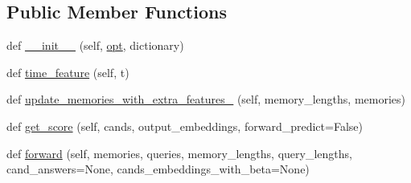 \subsection*{Public Member Functions}
\begin{DoxyCompactItemize}
\item 
def \hyperlink{classprojects_1_1memnn__feedback_1_1agent_1_1modules_1_1MemNN_a8fa66da5b82d5f224fe6d90f6beb4715}{\+\_\+\+\_\+init\+\_\+\+\_\+} (self, \hyperlink{classprojects_1_1memnn__feedback_1_1agent_1_1modules_1_1MemNN_ad5ca60da96aa65443275f7702521ed4d}{opt}, dictionary)
\item 
def \hyperlink{classprojects_1_1memnn__feedback_1_1agent_1_1modules_1_1MemNN_a74960a2ae628065a6c18e1125b8fd9fc}{time\+\_\+feature} (self, t)
\item 
def \hyperlink{classprojects_1_1memnn__feedback_1_1agent_1_1modules_1_1MemNN_a0842ffd89a6a7b05ecd96ffd9167ec25}{update\+\_\+memories\+\_\+with\+\_\+extra\+\_\+features\+\_\+} (self, memory\+\_\+lengths, memories)
\item 
def \hyperlink{classprojects_1_1memnn__feedback_1_1agent_1_1modules_1_1MemNN_abdfd4ea1cd5d9eada46e5f091d026d59}{get\+\_\+score} (self, cands, output\+\_\+embeddings, forward\+\_\+predict=False)
\item 
def \hyperlink{classprojects_1_1memnn__feedback_1_1agent_1_1modules_1_1MemNN_a2e5d4d84ef6b83ba8e6d8e765727973d}{forward} (self, memories, queries, memory\+\_\+lengths, query\+\_\+lengths, cand\+\_\+answers=None, cands\+\_\+embeddings\+\_\+with\+\_\+beta=None)
\end{DoxyCompactItemize}
